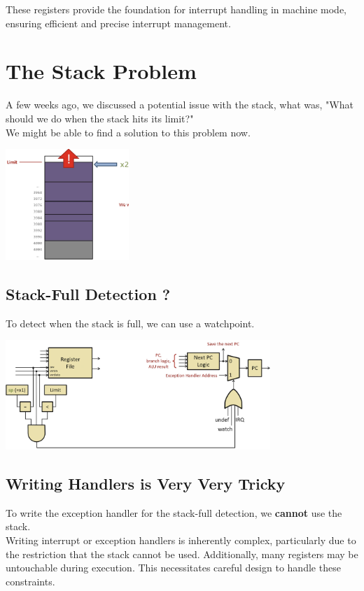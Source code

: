 These registers provide the foundation for interrupt handling in machine mode, ensuring efficient and precise interrupt management.

\section{The Stack Problem}
A few weeks ago, we discussed a potential issue with the stack, what was, "What should we do when the stack hits its limit?" \\
We might be able to find a solution to this problem now.
\begin{center}
    \includegraphics[width=0.35\textwidth]{chapters/chapter2d/images/limit_stack.png}
\end{center}

\newpage
\subsection{Stack-Full Detection ?}
To detect when the stack is full, we can use a watchpoint. \\
\begin{center}
    \includegraphics[width=0.75\textwidth]{chapters/chapter2d/images/stack_full.png}
\end{center}
\subsection{Writing Handlers is Very Very Tricky}
To write the exception handler for the stack-full detection, we \textbf{cannot} use the stack. \\
Writing interrupt or exception handlers is inherently complex, particularly due to the restriction that the stack cannot be used. Additionally, many registers may be untouchable during execution. This necessitates careful design to handle these constraints. 

